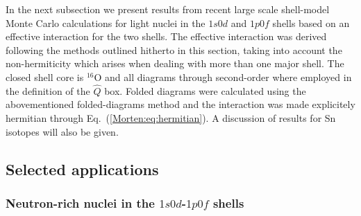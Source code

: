 In the next subsection we present results from recent 
large scale shell-model Monte Carlo calculations \cite{Morten:drhklz99}
for light nuclei in the $1s0d$ and $1p0f$ shells based 
on an effective interaction for the two shells.
The effective interaction was derived following the methods
outlined hitherto in this section, taking into account 
the non-hermiticity which arises when dealing 
with more than one major shell.
The closed shell core is $^{16}$O and all diagrams through
second-order where employed in the definition of the
$\hat{Q}$ box. Folded diagrams were calculated using the abovementioned
folded-diagrams method and the interaction was made explicitely
hermitian through Eq.~(\ref{Morten:eq:hermitian}). A discussion of results
for Sn isotopes will also be given.

\subsection{Selected applications}

\subsubsection{Neutron-rich nuclei in the $1s0d$-$1p0f$ shells}

